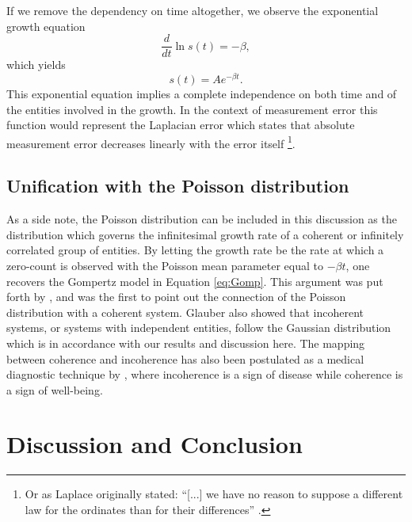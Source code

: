 \documentclass{article}
\begin{document}
If we remove the dependency on time altogether, we observe the exponential growth equation
\begin{equation}
  \frac{d}{dt}\ln s(t) = - \beta,
\end{equation}
which yields 
\begin{equation}
  s(t) = A e^{ - \beta t}.
\end{equation}
This exponential equation implies a complete independence on both time and of the entities involved in the growth. In the context of measurement error this function would represent the Laplacian error which states that absolute measurement error decreases linearly with the error itself \footnote{Or as Laplace originally stated: ``[...] we have no reason to suppose a different law for the ordinates than for their differences'' \cite{stahl2006evolution}.}. 


\subsection{Unification with the Poisson distribution}

As a side note, the Poisson distribution can be included in this discussion as the distribution which governs the infinitesimal growth rate of a coherent or infinitely correlated group of entities. By letting the growth rate be the rate at which a zero-count is observed with the Poisson mean parameter equal to $-\beta t$, one recovers the Gompertz model in Equation \ref{eq:Gomp}. This argument was put forth by \citet{shklovskii2005simple}, and \citet{glauber1963coherent} was the first to point out the connection of the Poisson distribution with a coherent system. Glauber also showed that incoherent systems, or systems with independent entities, follow the Gaussian distribution which is in accordance with our results and discussion here. The mapping between coherence and incoherence has also been postulated as a medical diagnostic technique by \citet{zhang1994log}, where incoherence is a sign of disease while coherence is a sign of well-being.

\section{Discussion and Conclusion}
\label{sec:discussion}
\end{document}
